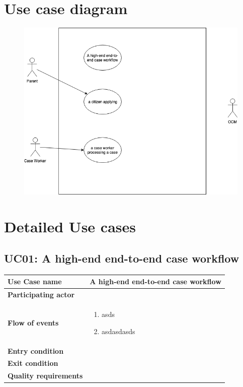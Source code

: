 \documentclass{article}
\begin{document}
\section{Use case diagram}


\begin{figure}[htb!]
	\includegraphics[width=\textwidth]{img/use-cases}
\end{figure}


\section{Detailed Use cases}

\subsection{UC01: A high-end end-to-end case workflow}

\begin{tabularx}{\textwidth}{l|l}
	\textbf{Use Case name} & A high-end end-to-end case workflow \\
	\hline
	\textbf{Participating actor} & \\
	\hline
	\textbf{Flow of events} &
	\begin{minipage}{\linewidth}
		\begin{enumerate}
			\item asds
			\item asdasdasds
		\end{enumerate} 
	\end{minipage}\\
	\hline
	\textbf{Entry condition} & \\
	\hline
	\textbf{Exit condition} & \\
	\hline
	\textbf{Quality requirements} & \\
\end{tabularx}
\end{document}
